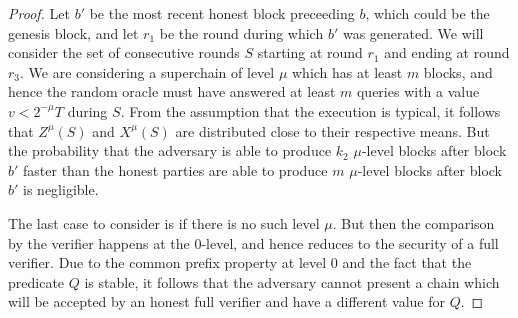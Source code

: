 \begin{proof}
    Let $b'$ be the most recent honest block preceeding $b$, which could be the
    genesis block, and let $r_1$ be the round during which $b'$ was generated.
    We will consider the set of consecutive rounds $S$ starting at round $r_1$
    and ending at round $r_3$. We are considering a superchain of level $\mu$
    which has at least $m$ blocks, and hence the random oracle must have
    answered at least $m$ queries with a value $v < 2^{-\mu}T$ during $S$. From
    the assumption that the execution is typical, it follows that $Z^\mu(S)$
    and $X^\mu(S)$ are distributed close to their respective means. But the
    probability that the adversary is able to produce $k_2$ $\mu$-level blocks
    after block $b'$ faster than the honest parties are able to produce $m$
    $\mu$-level blocks after block $b'$ is negligible.

    The last case to consider is if there is no such level $\mu$. But then the
    comparison by the verifier happens at the $0$-level, and hence reduces to
    the security of a full verifier. Due to the common prefix property at level
    $0$ and the fact that the predicate $Q$ is stable, it follows that the
    adversary cannot present a chain which will be accepted by an honest full
    verifier and have a different value for $Q$.
\end{proof}
